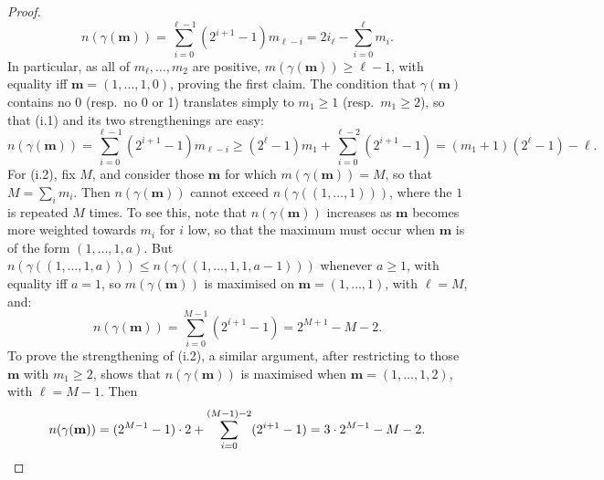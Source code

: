 \documentclass[10pt]{article}
\newcommand{\minDim}{m}
\begin{document}
\begin{KoszulSequenceCombinatorics}
\begin{proof}
\[n(\gamma(\textbf{m}))= \sum_{i=0}^{\ell-1}\left(2^{i+1}-1\right)m_{\ell-i}=2i_\ell-\sum_{i=0}^\ell m_i.\]
In particular, as all of $m_\ell,\ldots,m_2$ are positive, $\minDim(\gamma(\textbf{m}))\geq\ell-1$, with equality iff $\textbf{m}=(1,\ldots,1,0)$, proving the first claim.
The condition that $\gamma(\textbf{m})$ contains no 0 (resp.\ no 0 or 1) translates simply to $m_1\geq1$ (resp.\ $m_1\geq2$), so that \textup{(i.1)} and its two strengthenings are easy:
\[n(\gamma(\textbf{m}))= \sum_{i=0}^{\ell-1}\left(2^{i+1}-1\right)m_{\ell-i}\geq(2^{\ell}-1)m_1+ \sum_{i=0}^{\ell-2}\left(2^{i+1}-1\right)
=(m_1+1)(2^{\ell}-1)-\ell.\]
For \textup{(i.2)}, fix $M$, and consider those $\textbf{m}$ for which $\minDim(\gamma(\textbf{m}))=M$, so that $M=\sum_im_i$. Then $n(\gamma(\textbf{m}))$ cannot exceed $n(\gamma((1,\ldots,1)))$, where the $1$ is repeated $M$ times. To see this, note that $n(\gamma(\textbf{m}))$ increases as $\textbf{m}$ becomes more weighted towards $m_i$ for $i$ low, so that the maximum must occur when $\textbf{m}$ is of the form $(1,\ldots,1,a)$. But $n(\gamma((1,\ldots,1,a)))\leq n(\gamma((1,\ldots,1,1,a-1)))$ whenever $a\geq1$, with equality iff $a=1$, so $\minDim(\gamma(\textbf{m}))$ is maximised on $\textbf{m}=(1,\ldots,1)$, with $\ell=M$, and:
\[n(\gamma(\textbf{m}))=\sum_{i=0}^{M-1}(2^{i+1}-1)=2^{M+1}-M-2.\]
To prove the strengthening of \textup{(i.2)}, a similar argument, after restricting to those $\textbf{m}$ with $m_1\geq2$, shows that $n(\gamma(\textbf{m}))$ is maximised when $\textbf{m}=(1,\ldots,1,2)$, with $\ell=M-1$. Then
\[n(\gamma(\textbf{m})) =(2^{M-1}-1)\cdot2+\sum_{i=0}^{(M-1)-2}(2^{i+1}-1)=3\cdot2^{M-1}-M-2.\qedhere\]
\end{proof}
%

\end{KoszulSequenceCombinatorics}
\end{document}
